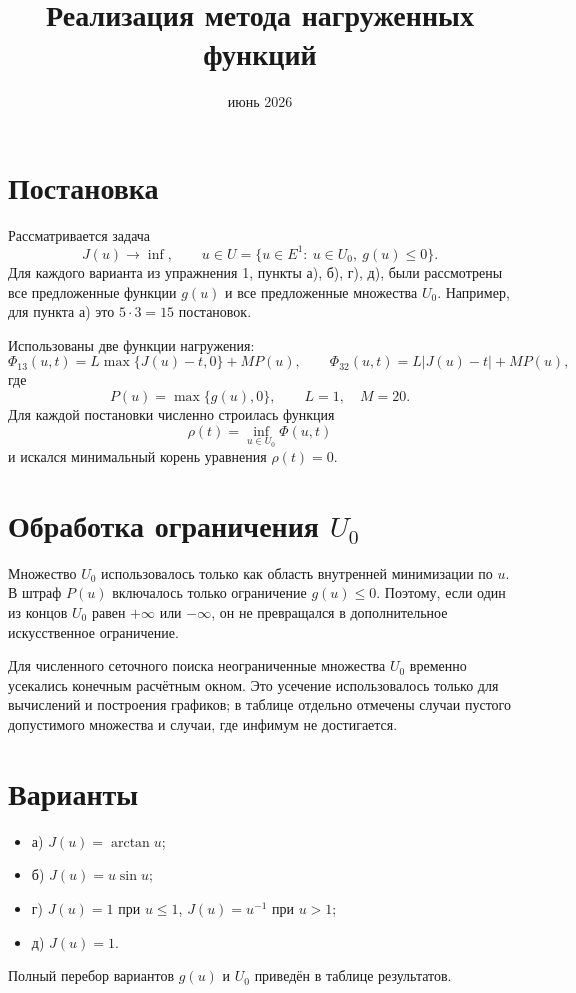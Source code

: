 \documentclass[12pt,a4paper]{article}
\title{Реализация метода нагруженных функций}
\author{}
\date{июнь 2026}
\begin{document}
\maketitle

\section*{Постановка}
Рассматривается задача
\[
J(u)\to \inf,\qquad
u\in U=\{u\in E^1:\ u\in U_0,\ g(u)\le 0\}.
\]
Для каждого варианта из упражнения 1, пункты а), б), г), д), были рассмотрены все предложенные функции \(g(u)\) и все предложенные множества \(U_0\). Например, для пункта а) это \(5\cdot 3=15\) постановок.

Использованы две функции нагружения:
\[
\Phi_{13}(u,t)=L\max\{J(u)-t,0\}+MP(u),
\qquad
\Phi_{32}(u,t)=L|J(u)-t|+MP(u),
\]
где
\[
P(u)=\max\{g(u),0\},\qquad L=1,\quad M=20.
\]
Для каждой постановки численно строилась функция
\[
\rho(t)=\inf_{u\in U_0}\Phi(u,t)
\]
и искался минимальный корень уравнения \(\rho(t)=0\).

\section*{Обработка ограничения \(U_0\)}
Множество \(U_0\) использовалось только как область внутренней минимизации по \(u\). В штраф \(P(u)\) включалось только ограничение \(g(u)\le 0\). Поэтому, если один из концов \(U_0\) равен \(+\infty\) или \(-\infty\), он не превращался в дополнительное искусственное ограничение.

Для численного сеточного поиска неограниченные множества \(U_0\) временно усекались конечным расчётным окном. Это усечение использовалось только для вычислений и построения графиков; в таблице отдельно отмечены случаи пустого допустимого множества и случаи, где инфимум не достигается.

\section*{Варианты}
\begin{itemize}
    \item а) \(J(u)=\arctan u\);
    \item б) \(J(u)=u\sin u\);
    \item г) \(J(u)=1\) при \(u\le 1\), \(J(u)=u^{-1}\) при \(u>1\);
    \item д) \(J(u)=1\).
\end{itemize}
Полный перебор вариантов \(g(u)\) и \(U_0\) приведён в таблице результатов.
\end{document}
